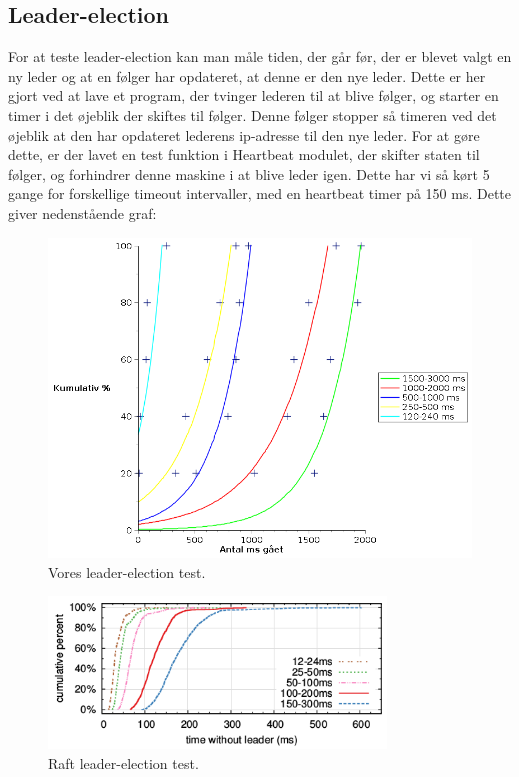 \documentclass[a4paper,12pt]{article}
\begin{document}
\subsection{Leader-election}
For at teste leader-election kan man måle tiden, der går før, der er blevet valgt en ny leder og at en følger har opdateret, at denne er den nye leder. Dette er her gjort ved at lave et program, der tvinger lederen til at blive følger, og starter en timer i det øjeblik der skiftes til følger. Denne følger stopper så timeren ved det øjeblik at den har opdateret lederens ip-adresse til den nye leder.
For at gøre dette, er der lavet en test funktion i Heartbeat modulet, der skifter staten til følger, og forhindrer denne maskine i at blive leder igen.
Dette har vi så kørt 5 gange for forskellige timeout intervaller, med en heartbeat timer på 150 ms. 
Dette giver nedenstående graf:
\\
\begin{figure}[H]
  \caption{Vores leader-election test.}
  \centering
    \includegraphics[width=1.2\textwidth]{Newleadergraf.png}
\end{figure}

\begin{figure}[H]
  \caption{Raft leader-election test.}
  \centering
    \includegraphics[width=0.8\textwidth]{Raftleadergraf.png}
\end{figure}
\end{document}
